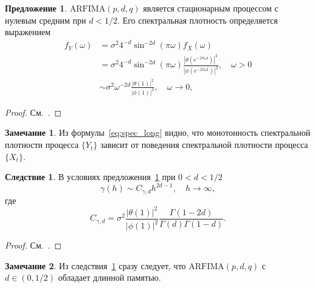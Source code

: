 \documentclass[specialist,
substylefile = spbu_report.rtx,
subf,href,colorlinks=true, 12pt]{disser}
\theoremstyle{definition}
\newtheorem{remark}{Замечание}[section]
\newtheorem{example}{Пример}[section]
\newtheorem{proposition}{Предложение}[section]
\newtheorem{corollary}{Следствие}[section]
\newcommand{\im}{\mathrm{i}}
\begin{document}
\begin{proposition}\label{prop1}
	$\mathrm{ARFIMA}(p, d, q)$ является стационарным процессом с нулевым средним при $d<1/2$. Его спектральная плотность определяется выражением
	\begin{equation}\label{eq:spec_long}
		\begin{aligned}
			f_Y(\omega) & =\sigma^2 4^{-d}\sin^{-2d}\left(\pi\omega\right)f_X(\omega)                                                                                              \\
			            & =\sigma^2 4^{-d}\sin^{-2d}\left(\pi\omega\right)\frac{\left|\theta(e^{-2\pi \omega\im})\right|^2}{\left|\phi(e^{-2\pi\omega\im})\right|^2},\quad\omega>0 \\
			            & \sim\sigma^2\omega^{-2d}\frac{|\theta(1)|^2}{|\phi(1)|^2},\quad \omega\to0,
		\end{aligned}
	\end{equation}
\end{proposition}
\begin{proof}
	См.~\cite[Proposition 6.1]{Hassler2018}.
\end{proof}
\begin{remark}
	Из формулы~\eqref{eq:spec_long} видно, что монотонность спектральной плотности процесса $\{Y_t\}$ зависит от поведения спектральной плотности процесса $\{X_t\}$.
\end{remark}
\begin{corollary}\label{corollary1}
	В условиях предложения~\ref{prop1} при $0<d<1/2$
	\[
		\gamma(h)\sim C_{\gamma,d}h^{2d-1},\quad h\to\infty,
	\]
	где
	\[
		C_{\gamma,d}=\sigma^2 \frac{|\theta(1)|^2}{|\phi(1)|^2} \frac{\Gamma(1-2d)}{\Gamma(d)\Gamma(1-d)}.
	\]
\end{corollary}
\begin{proof}
	См.~\cite[Corollary 6.1]{Hassler2018}.
\end{proof}
\begin{remark}
	Из следствия~\ref{corollary1} сразу следует, что $\mathrm{ARFIMA}(p, d, q)$ с $d\in(0, 1/2)$ обладает длинной памятью.
\end{remark}
\end{document}
